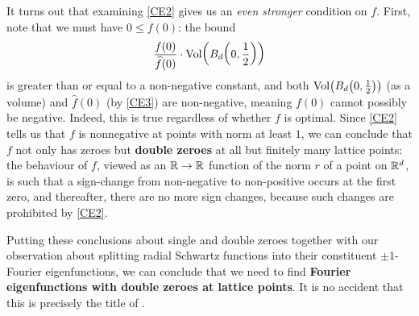 It turns out that examining \ref{CE2} gives us an \textit{even stronger} condition on $f$. First, note that we must have $0 \leq f(0)$: the bound
\begin{align*}
    \frac{f(0)}{\widehat{f}(0)} \cdot \operatorname{Vol}\!\left( B_d\!\left( 0, \frac{1}{2} \right) \right)
\end{align*}
is greater than or equal to a non-negative constant, and both $\operatorname{Vol}\!\left( B_d\!\left( 0, \frac{1}{2} \right) \right)$ (as a volume) and $\hat{f}(0)$ (by \ref{CE3}) are non-negative, meaning $f(0)$ cannot possibly be negative. Indeed, this is true regardless of whether $f$ is optimal. Since \ref{CE2} tells us that $f$ is nonnegative at points with norm at least $1$, we can conclude that $f$ not only has zeroes but \textbf{double zeroes} at all but finitely many lattice points: the behaviour of $f$, viewed as an $\mathbb{R} \to \mathbb{R}$ function of the norm $r$ of a point on $\mathbb{R}^d$, is such that a sign-change from non-negative to non-positive occurs at the first zero, and thereafter, there are no more sign changes, because such changes are prohibited by \ref{CE2}.

Putting these conclusions about single and double zeroes together with our observation about splitting radial Schwartz functions into their constituent $\pm 1$-Fourier eigenfunctions, we can conclude that we need to find \textbf{Fourier eigenfunctions with double zeroes at lattice points}. It is no accident that this is precisely the title of \cite[Section 4]{Viazovska8}.


